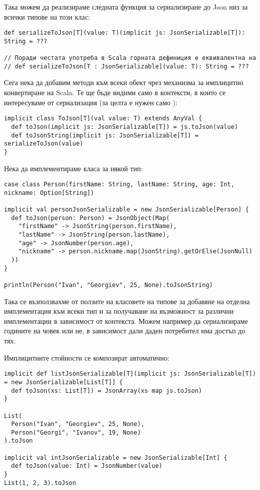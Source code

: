 Така можем да реализираме следната функция за сериализиране до Json низ за всички типове на този клас:

\begin{lstlisting}[texcl=true]
def serializeToJson[T](value: T)(implicit js: JsonSerializable[T]): String = ???

// Поради честата употреба в Scala горната дефиниция е еквивалентна на
// def serializeToJson[T : JsonSerializable](value: T): String = ???
\end{lstlisting}

Сега нека да добавим  методи към всеки обект чрез механизма за имплицитно конвертиране на Scala. Те ще бъде видими само в контексти, в които се интересуваме от сериализация (за целта е нужен само ):

\begin{lstlisting}
implicit class ToJson[T](val value: T) extends AnyVal {
  def toJson(implicit js: JsonSerializable[T]) = js.toJson(value)
  def toJsonString(implicit js: JsonSerializable[T]) = serializeToJson(value)
}
\end{lstlisting}

Нека да имплементираме класа за някой тип:

\begin{lstlisting}
case class Person(firstName: String, lastName: String, age: Int, nickname: Option[String])

implicit val personJsonSerializable = new JsonSerializable[Person] {
  def toJson(person: Person) = JsonObject(Map(
    "firstName" -> JsonString(person.firstName),
    "lastName" -> JsonString(person.lastName),
    "age" -> JsonNumber(person.age),
    "nickname" -> person.nickname.map(JsonString).getOrElse(JsonNull)
  ))
}

println(Person("Ivan", "Georgiev", 25, None).toJsonString)
\end{lstlisting}

Така се възползвахме от ползите на класовете на типове за добавяне на отделна имплементация към всеки тип и за получаване на възможност за различни имплементации в зависимост от контекста. Можем например да сериализираме годините на човек или не, в зависимост дали даден потребител има достъп до тях.

Имплицитните стойности се композират автоматично:

\begin{lstlisting}
implicit def listJsonSerializable[T](implicit js: JsonSerializable[T]) = new JsonSerializable[List[T]] {
  def toJson(xs: List[T]) = JsonArray(xs map js.toJson)
}

List(
  Person("Ivan", "Georgiev", 25, None),
  Person("Georgi", "Ivanov", 19, None)
).toJson

implicit val intJsonSerializable = new JsonSerializable[Int] {
  def toJson(value: Int) = JsonNumber(value)
}
List(1, 2, 3).toJson
\end{lstlisting}

